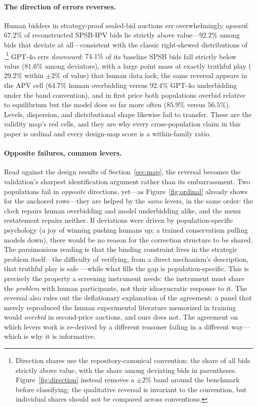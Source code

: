 \paragraph{The direction of errors reverses.}
Human bidders in strategy-proof sealed-bid auctions err overwhelmingly \emph{upward}: $67.2\%$ of reconstructed SPSB-IPV bids lie strictly above value---$92.2\%$ among bids that deviate at all---consistent with the classic right-skewed distributions of \citet{kagel1993independent}.\footnote{Direction shares use the repository-canonical convention: the share of all bids strictly above value, with the share among deviating bids in parentheses. Figure~\ref{fig:direction} instead removes a $\pm2\%$ band around the benchmark before classifying; the qualitative reversal is invariant to the convention, but individual shares should not be compared across conventions.} GPT-4o errs \emph{downward}: $74.1\%$ of its baseline SPSB bids fall strictly below value ($81.6\%$ among deviators), with a large point mass at exactly truthful play ($29.2\%$ within $\pm2\%$ of value) that human data lack; the same reversal appears in the APV cell ($64.7\%$ human overbidding versus $92.4\%$ GPT-4o underbidding under the band convention), and in first price both populations overbid relative to equilibrium but the model does so far more often ($85.9\%$ versus $56.5\%$). Levels, dispersion, and distributional shape likewise fail to transfer. These are the validity map's red cells, and they are why every cross-population claim in this paper is ordinal and every design-map score is a within-family ratio.

\paragraph{Opposite failures, common levers.}
Read against the design results of Section~\ref{sec:map}, the reversal becomes the validation's sharpest identification argument rather than its embarrassment. Two populations fail in \emph{opposite} directions, yet---as Figure~\ref{fig:ordinal} already shows for the anchored rows---they are helped by the \emph{same} levers, in the same order: the clock repairs human overbidding and model underbidding alike, and the menu restatement repairs neither. If deviations were driven by population-specific psychology (a joy of winning pushing humans up; a trained conservatism pulling models down), there would be no reason for the correction structure to be shared. The parsimonious reading is that the binding constraint lives in the strategic problem itself---the difficulty of verifying, from a direct mechanism's description, that truthful play is safe \citep{li2017obviously, oprea2024decisions}---while what fills the gap is population-specific. This is precisely the property a screening instrument needs: the instrument must share the \emph{problem} with human participants, not their idiosyncratic response to it. The reversal also rules out the deflationary explanation of the agreement: a panel that merely reproduced the human experimental literature memorized in training would \emph{overbid} in second-price auctions, and ours does not. The agreement on which levers work is re-derived by a different reasoner failing in a different way---which is why it is informative.

